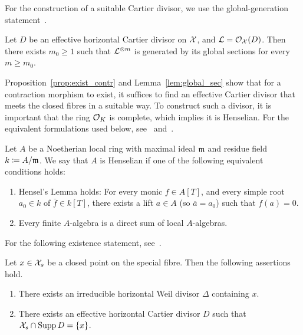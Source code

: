 For the construction of a suitable Cartier divisor, we use the global-generation statement~\cite[Lemma 8.3.32]{Liu}.

\begin{lemma} \label{lem:global_sec}
    Let $D$ be an effective horizontal Cartier divisor on $\mathcal X$, and $\mathcal{L} = \mathcal{O}_\mathcal X(D)$.
    Then there exists $m_0 \geq 1$ such that $\mathcal{L}^{\otimes m}$ is generated by its global sections for every $m \geq m_0$.
\end{lemma}

Proposition~\ref{prop:exist_contr} and Lemma~\ref{lem:global_sec} show that for a contraction morphism to exist,
it suffices to find an effective Cartier divisor that meets the closed fibres in a suitable way.
To construct such a divisor, it is important that the ring $\mathcal O_K $ is complete, which implies it is Henselian.
For the equivalent formulations used below, see~\cite[8.3.33]{Liu} and~\cite[\href{https://stacks.math.columbia.edu/tag/04GG}{Lemma 04GG}]{Stacks}.

\begin{definition}
    Let $A$ be a Noetherian local ring with maximal ideal $\mathfrak m$ and residue field $k \coloneqq A/\mathfrak m$.
    We say that $A$ is Henselian if one of the following equivalent conditions holds:
    \begin{enumerate}[label=\textup{(\alph*)}]
        \item Hensel's Lemma holds: For every monic $f \in A[T]$, and every simple root $a_0 \in k$ of $\bar{f} \in k[T]$,
            there exists a lift $a \in A$ (so $\overline{a} = a_0$) such that $f(a) = 0$.
        \item Every finite $A$-algebra is a direct sum of local $A$-algebras.
    \end{enumerate}
\end{definition}

For the following existence statement, see~\cite[Lemma 8.3.35]{Liu}.

\begin{lemma} \label{lem:exist_div}
    Let $x \in \mathcal X_s$ be a closed point on the special fibre.
    Then the following assertions hold.
    \begin{enumerate}[label=\textup{(\roman*)}]
        \item There exists an irreducible horizontal Weil divisor $\Delta$ containing $x$. \label{lem:exist_div_i}
        \item There exists an effective horizontal Cartier divisor $D$ such that $\mathcal X_s \cap \operatorname{Supp}{D} = \{x\}$. \label{lem:exist_div_ii}
    \end{enumerate}
\end{lemma}

